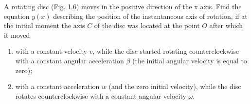 
\item A rotating disc (Fig. 1.6) moves in the positive direction of the x axis. Find the equation \( y(x) \) describing the position of the instantaneous axis of rotation, if at the initial moment the axis \( C \) of the disc was located at the point \( O \) after which it moved
    \begin{enumerate}
        \item with a constant velocity \( v \), while the disc started rotating counterclockwise with a constant angular acceleration \( \beta \) (the initial angular velocity is equal to zero);
    
        \item with a constant acceleration \( w \) (and the zero initial velocity), while the disc rotates counterclockwise with a constant angular velocity \( \omega \).
    \end{enumerate}
